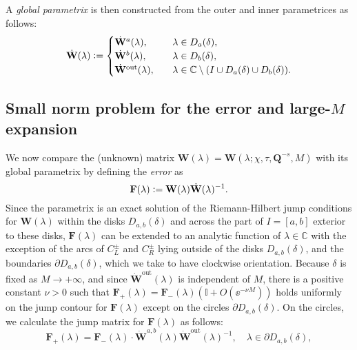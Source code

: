 A \emph{global parametrix} is then constructed from the outer and inner parametrices as follows:
\begin{equation}
\dot{\mathbf{W}}(\lambda)\vcentcolon=\begin{cases}
\dot{\mathbf{W}}^a(\lambda),&\quad\lambda\in D_a(\delta),\\
\dot{\mathbf{W}}^b(\lambda),&\quad\lambda\in D_b(\delta),\\
\dot{\mathbf{W}}^\mathrm{out}(\lambda),&\quad\lambda\in\mathbb{C}\setminus (I\cup D_a(\delta)\cup D_b(\delta)).
\end{cases}
\end{equation}

\subsection{Small norm problem for the error and large-$M$ expansion}
\label{sec:small-norm-channels}
We now compare the (unknown) matrix $\mathbf{W}(\lambda)=\mathbf{W}(\lambda;\chi,\tau,\mathbf{Q}^{-s},M)$ with its global parametrix by defining the \emph{error} as
\begin{equation}
\mathbf{F}(\lambda)\vcentcolon=\mathbf{W}(\lambda)\dot{\mathbf{W}}(\lambda)^{-1}.
\end{equation}
Since the parametrix is an exact solution of the Riemann-Hilbert jump conditions for $\mathbf{W}(\lambda)$ within the disks $D_{a,b}(\delta)$ and across the part of $I=[a,b]$ exterior to these disks, 
$\mathbf{F}(\lambda)$ can be extended to an analytic function of $\lambda\in\mathbb{C}$ with the exception of the arcs of $C_L^\pm$ and $C_R^\pm$ lying outside of the disks $D_{a,b}(\delta)$, and the boundaries $\partial D_{a,b}(\delta)$, which we take to have clockwise orientation.  Because $\delta$ is fixed 
as $M\to+\infty$,
and since $\dot{\mathbf{W}}^\mathrm{out}(\lambda)$ is independent of 
$M$,
there is a positive constant $\nu>0$ such that 
$\mathbf{F}_+(\lambda)=\mathbf{F}_-(\lambda)(\mathbb{I}+O(\ee^{-\nu M}))$ holds uniformly on the jump contour for $\mathbf{F}(\lambda)$ except on the circles $\partial D_{a,b}(\delta)$.  On the circles, we calculate the jump matrix for $\mathbf{F}(\lambda)$ as follows:
\begin{equation}
\mathbf{F}_+(\lambda)=\mathbf{F}_-(\lambda)\cdot\dot{\mathbf{W}}^{a,b}(\lambda)\dot{\mathbf{W}}^\mathrm{out}(\lambda)^{-1},\quad\lambda\in\partial D_{a,b}(\delta),
\end{equation}

